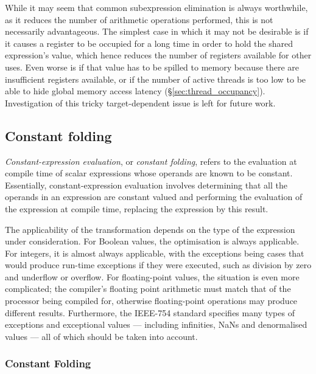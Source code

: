 While it may seem that common subexpression elimination is always worthwhile, as
it reduces the number of arithmetic operations performed, this is not
necessarily advantageous. The simplest case in which it may not be desirable is
if it causes a register to be occupied for a long time in order to hold the
shared expression's value, which hence reduces the number of registers available
for other uses. Even worse is if that value has to be spilled to memory because
there are insufficient registers available, or if the number of active threads
is too low to be able to hide global memory access latency
(\S\ref{sec:thread_occupancy}). Investigation of this tricky target-dependent
issue is left for future work.


\subsection{Constant folding}
\label{sec:constant_folding}

\emph{Constant-expression evaluation}, or \emph{constant folding}, refers to the
evaluation at compile time of scalar expressions whose operands are known to be
constant. Essentially, constant-expression evaluation involves determining that
all the operands in an expression are constant valued and performing the
evaluation of the expression at compile time, replacing the expression by this
result.

The applicability of the transformation depends on the type of the expression
under consideration. For Boolean values, the optimisation is always applicable.
For integers, it is almost always applicable, with the exceptions being cases
that would produce run-time exceptions if they were executed, such as division
by zero and underflow or overflow. For floating-point values, the situation is
even more complicated; the compiler's floating point arithmetic must match that
of the processor being compiled for, otherwise floating-point operations may
produce different results. Furthermore, the IEEE-754 standard specifies many
types of exceptions and exceptional values --- including infinities, NaNs and
denormalised values --- all of which should be taken into account.


\subsubsection{Constant Folding}

